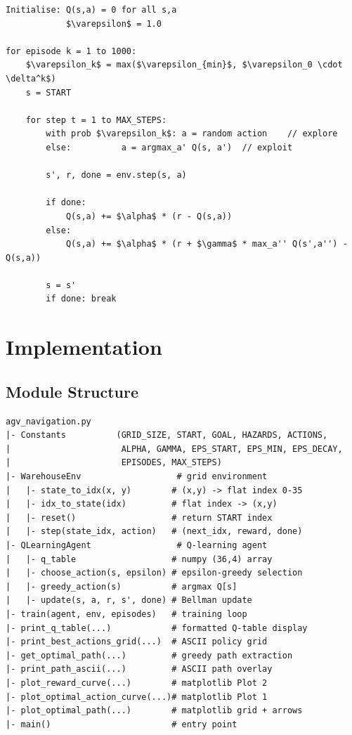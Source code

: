 \documentclass[12pt]{article}
\begin{document}
\begin{lstlisting}[language={}, caption={Tabular Q-Learning (pseudocode)}, mathescape=true]
Initialise: Q(s,a) = 0 for all s,a
            $\varepsilon$ = 1.0

for episode k = 1 to 1000:
    $\varepsilon_k$ = max($\varepsilon_{min}$, $\varepsilon_0 \cdot \delta^k$)
    s = START

    for step t = 1 to MAX_STEPS:
        with prob $\varepsilon_k$: a = random action    // explore
        else:          a = argmax_a' Q(s, a')  // exploit

        s', r, done = env.step(s, a)

        if done:
            Q(s,a) += $\alpha$ * (r - Q(s,a))
        else:
            Q(s,a) += $\alpha$ * (r + $\gamma$ * max_a'' Q(s',a'') - Q(s,a))

        s = s'
        if done: break
\end{lstlisting}

\section{Implementation}

\subsection{Module Structure}

\begin{lstlisting}[caption={Layout of agv\_navigation.py}]
agv_navigation.py
|- Constants          (GRID_SIZE, START, GOAL, HAZARDS, ACTIONS,
|                      ALPHA, GAMMA, EPS_START, EPS_MIN, EPS_DECAY,
|                      EPISODES, MAX_STEPS)
|- WarehouseEnv                   # grid environment
|   |- state_to_idx(x, y)        # (x,y) -> flat index 0-35
|   |- idx_to_state(idx)         # flat index -> (x,y)
|   |- reset()                   # return START index
|   |- step(state_idx, action)   # (next_idx, reward, done)
|- QLearningAgent                 # Q-learning agent
|   |- q_table                   # numpy (36,4) array
|   |- choose_action(s, epsilon) # epsilon-greedy selection
|   |- greedy_action(s)          # argmax Q[s]
|   |- update(s, a, r, s', done) # Bellman update
|- train(agent, env, episodes)   # training loop
|- print_q_table(...)            # formatted Q-table display
|- print_best_actions_grid(...)  # ASCII policy grid
|- get_optimal_path(...)         # greedy path extraction
|- print_path_ascii(...)         # ASCII path overlay
|- plot_reward_curve(...)        # matplotlib Plot 2
|- plot_optimal_action_curve(...)# matplotlib Plot 1
|- plot_optimal_path(...)        # matplotlib grid + arrows
|- main()                        # entry point
\end{lstlisting}
\end{document}
